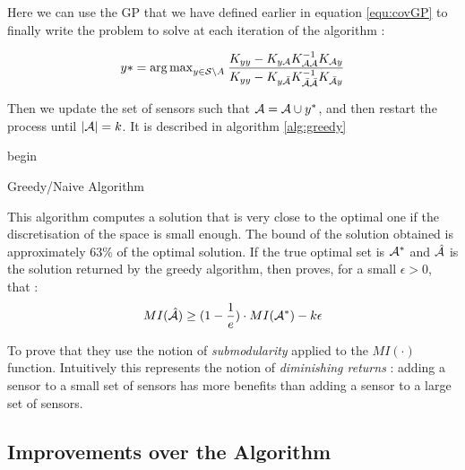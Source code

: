Here we can use the GP that we have defined earlier in equation \ref{equ:covGP} to finally write the problem to solve at each iteration of the algorithm : 

\begin{equation}
    y*  = {\arg \max}_{y \in \mathcal{S} \backslash A } \: \frac{K_{yy} - K_{y\mathcal{A}} K_{\mathcal{A}\mathcal{A}}^{-1} K_{\mathcal{A} y} }{K_{yy} - K_{y\bar{\mathcal{A}}} K_{\bar{\mathcal{A}}\bar{\mathcal{A}}}^{-1} K_{\bar{\mathcal{A}} y} } \label{equ:updateGreedy}
\end{equation}

Then we update the set of sensors such that $\mathcal{A} = \mathcal{A} \cup y^*$, and then restart the process until $|\mathcal{A}| = k$. It is described in algorithm \ref{alg:greedy}  \\

\begin{algorithm}[h!]
 begin\;
 \caption{Greedy/Naive Algorithm}
 \label{alg:greedy}
\end{algorithm}


This algorithm computes a solution that is very close to the optimal one if the discretisation of the space is small enough. The bound of the solution obtained is approximately 63\% of the optimal solution. If the true optimal set is $\mathcal{A}^*$ and $\hat{\mathcal{A}}$ is the solution returned by the greedy algorithm, then \citet{krause_near-optimal_2008} proves, for a small $\epsilon >0 $, that : 
 \begin{equation}
    MI(\hat{\mathcal{A}}) \geq (1 - \frac{1}{e}) \cdot MI(\mathcal{A}^*) - k\epsilon
\end{equation}

To prove that they use the notion of \textit{submodularity} \citep{nemhauser_analysis_1978} applied to the $MI(\cdot)$ function. Intuitively this represents the notion of \textit{diminishing returns} :  adding a sensor to a small set of sensors has more benefits than adding a sensor to a large set of sensors. 


\subsection{Improvements over the Algorithm}


